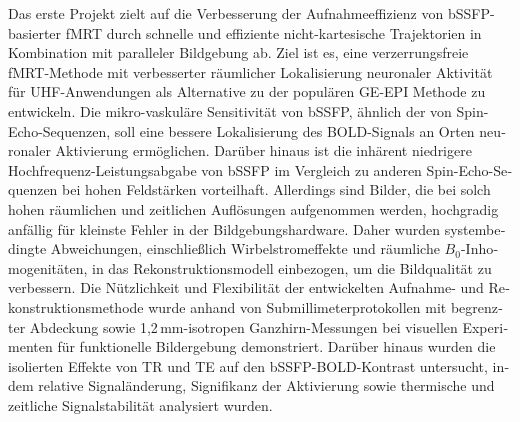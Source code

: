 \begin{otherlanguage}{german}
	Das erste Projekt zielt auf die Verbesserung der Aufnahmeeffizienz von bSSFP-basierter \gls{fMRT} durch schnelle und effiziente nicht-kartesische Trajektorien in Kombination mit paralleler Bildgebung ab. Ziel ist es, eine verzerrungsfreie \gls{fMRT}-Methode mit verbesserter räumlicher Lokalisierung neuronaler Aktivität für \gls{UHF}-Anwendungen als Alternative zu der populären \gls{GE}-\gls{EPI} Methode zu entwickeln. Die mikro-vaskuläre Sensitivität von \gls{bSSFP}, ähnlich der von Spin-Echo-Sequenzen, soll eine bessere Lokalisierung des \gls{BOLD}-Signals an Orten neuronaler Aktivierung ermöglichen. Darüber hinaus ist die inhärent niedrigere Hochfrequenz-Leistungsabgabe von \gls{bSSFP} im Vergleich zu anderen Spin-Echo-Sequenzen bei hohen Feldstärken vorteilhaft. Allerdings sind Bilder, die bei solch hohen räumlichen und zeitlichen Auflösungen aufgenommen werden, hochgradig anfällig für kleinste Fehler in der Bildgebungshardware. Daher wurden systembedingte Abweichungen, einschließlich Wirbelstromeffekte und räumliche $B_0$-Inhomogenitäten, in das Rekonstruktionsmodell einbezogen, um die Bildqualität zu verbessern. Die Nützlichkeit und Flexibilität der entwickelten Aufnahme- und Rekonstruktionsmethode wurde anhand von Submillimeterprotokollen mit begrenzter Abdeckung sowie 1,2\,mm-isotropen Ganzhirn-Messungen bei visuellen Experimenten für funktionelle Bildergebung demonstriert. Darüber hinaus wurden die isolierten Effekte von \gls{TR} und \gls{TE} auf den \gls{bSSFP}-\gls{BOLD}-Kontrast untersucht, indem relative Signaländerung, Signifikanz der Aktivierung sowie thermische und zeitliche Signalstabilität analysiert wurden.
	

\end{otherlanguage}
